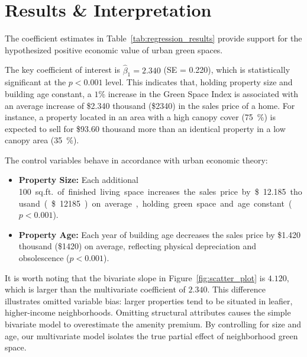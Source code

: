 \section{Results \& Interpretation}
The coefficient estimates in Table~\ref{tab:regression_results} provide support for the hypothesized positive economic value of urban green spaces.

The key coefficient of interest is $\hat{\beta}_1 = \num{2.340}$ (SE = \num{0.220}), which is statistically significant at the $p < 0.001$ level. This indicates that, holding property size and building age constant, a $1\%$ increase in the Green Space Index is associated with an average increase of \$\num{2.340} thousand (\$\num{2340}) in the sales price of a home. For instance, a property located in an area with a high canopy cover (\qty{75}{\percent}) is expected to sell for \$\num{93.60} thousand more than an identical property in a low canopy area (\qty{35}{\percent}).

The control variables behave in accordance with urban economic theory:
\begin{itemize}[leftmargin=1.0cm, noitemsep]
    \item \textbf{Property Size:} Each additional \qty{100}{sq.ft.} of finished living space increases the sales price by \$\num{12.185} thousand (\$\num{12185}) on average, holding green space and age constant ($p < 0.001$).
    \item \textbf{Property Age:} Each year of building age decreases the sales price by \$\num{1.420} thousand (\$\num{1420}) on average, reflecting physical depreciation and obsolescence ($p < 0.001$).
\end{itemize}

It is worth noting that the bivariate slope in Figure~\ref{fig:scatter_plot} is $\num{4.120}$, which is larger than the multivariate coefficient of $\num{2.340}$. This difference illustrates omitted variable bias: larger properties tend to be situated in leafier, higher-income neighborhoods. Omitting structural attributes causes the simple bivariate model to overestimate the amenity premium. By controlling for size and age, our multivariate model isolates the true partial effect of neighborhood green space.
